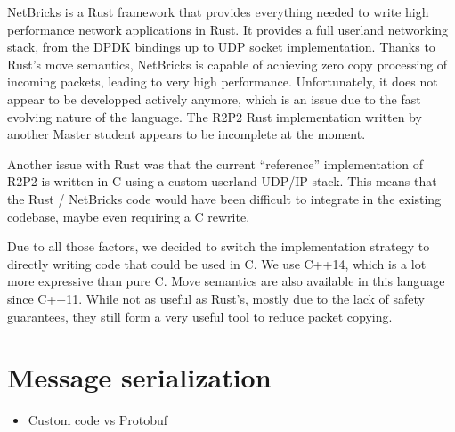 NetBricks\cite{netbricks} is a Rust framework that provides everything needed to write high performance network applications in Rust.  %
It provides a full userland networking stack, from the DPDK bindings up to UDP socket implementation.
Thanks to Rust's move semantics, NetBricks is capable of achieving zero copy processing of incoming packets, leading to very high performance.
Unfortunately, it does not appear to be developped actively anymore, which is an issue due to the fast evolving nature of the language.
The R2P2 Rust implementation\cite{ogier} written by another Master student appears to be incomplete at the moment.

Another issue with Rust was that the current ``reference'' implementation of R2P2 is written in C using a custom userland UDP/IP stack.
This means that the Rust / NetBricks code would have been difficult to integrate in the existing codebase, maybe even requiring a C rewrite.

Due to all those factors, we decided to switch the implementation strategy to directly writing code that could be used in C.
We use C++14, which is a lot more expressive than pure C.
Move semantics are also available in this language since C++11.
While not as useful as Rust's, mostly due to the lack of safety guarantees, they still form a very useful tool to reduce packet copying.

\section{Message serialization}


\begin{itemize}
    \item Custom code vs Protobuf
\end{itemize}

